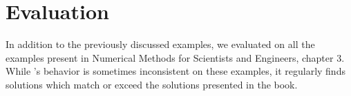 \documentclass[paper.tex]{subfiles}
\begin{document}
\section{Evaluation}


In addition to the previously discussed examples,
we evaluated \casio on all the examples present
in Numerical Methods for Scientists and Engineers, chapter 3.
While \casio's behavior is sometimes inconsistent on these examples,
it regularly finds solutions which match or exceed the solutions presented in the book.
\end{document}

